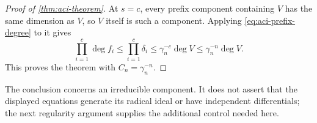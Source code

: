 \begin{proof}[Proof of \cref{thm:aci-theorem}]
At $s=c$, every prefix component containing $V$ has the same dimension as $V$, so $V$ itself is such a component.  Applying \eqref{eq:aci-prefix-degree} to it gives
\[
 \prod_{i=1}^c\deg f_i
 \le\prod_{i=1}^c\delta_i
 \le\gamma_n^{-c}\deg V
 \le\gamma_n^{-n}\deg V.
\]
This proves the theorem with $C_n=\gamma_n^{-n}$.
\end{proof}

The conclusion concerns an irreducible component.  It does not assert that the displayed equations generate its radical ideal or have independent differentials; the next regularity argument supplies the additional control needed here.
